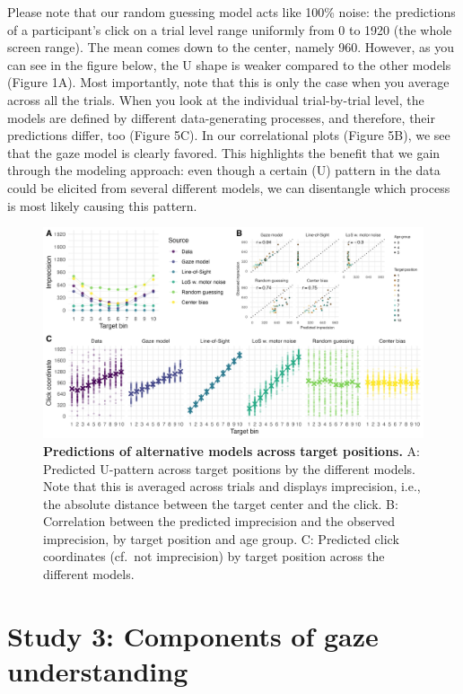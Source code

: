 \documentclass[
  man,floatsintext]{apa7}
\begin{document}
Please note that our random guessing model acts like 100\% noise: the predictions of a participant's click on a trial level range uniformly from 0 to 1920 (the whole screen range). The mean comes down to the center, namely 960. However, as you can see in the figure below, the U shape is weaker compared to the other models (Figure 1A). Most importantly, note that this is only the case when you average across all the trials. When you look at the individual trial-by-trial level, the models are defined by different data-generating processes, and therefore, their predictions differ, too (Figure 5C). In our correlational plots (Figure 5B), we see that the gaze model is clearly favored. This highlights the benefit that we gain through the modeling approach: even though a certain (U) pattern in the data could be elicited from several different models, we can disentangle which process is most likely causing this pattern.



\begin{figure}[H]

{\centering \includegraphics[width=1\linewidth]{../figures/gazemodel_simulated_u} 

}

\caption{\textbf{Predictions of alternative models across target positions.} A: Predicted U-pattern across target positions by the different models. Note that this is averaged across trials and displays imprecision, i.e., the absolute distance between the target center and the click. B: Correlation between the predicted imprecision and the observed imprecision, by target position and age group. C: Predicted click coordinates (cf.~not imprecision) by target position across the different models.}\label{fig:fig5}
\end{figure}

\hypertarget{study-3-components-of-gaze-understanding}{%
\section{Study 3: Components of gaze understanding}\label{study-3-components-of-gaze-understanding}}
\end{document}
